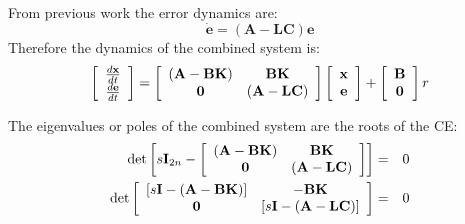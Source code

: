 From previous work the error dynamics are:
\[
\dot{\mathbf{e}} = (\mathbf{A}-\mathbf{LC})\mathbf{e}
\]
Therefore the dynamics of the combined system is:
\[\left[ {\begin{array}{*{20}c}
   {\frac{{d{\bf{x}}}}{{dt}}}  \\
   {\frac{{d{\bf{e}}}}{{dt}}}  \\
\end{array}} \right] = \left[ {\begin{array}{*{20}c}
   {\left( {{\bf{A}} - {\bf{BK}}} \right)} & {{\bf{BK}}}  \\
   {\bf{0}} & {\left( {{\bf{A}} - {\bf{LC}}} \right)}  \\
\end{array}} \right]\left[ {\begin{array}{*{20}c}
   {\bf{x}}  \\
   {\bf{e}}  \\
\end{array}} \right] + \left[ {\begin{array}{*{20}c}
   {\bf{B}}  \\
   {\bf{0}}  \\
\end{array}} \right]r
\]

The eigenvalues or poles of the combined system are the roots of the CE:
\begin{eqnarray*}
	\det \left[ {s{\bf{I}}_{2n}  - \left[ {\begin{array}{*{20}c}
	   {\left( {{\bf{A}} - {\bf{BK}}} \right)} & {{\bf{BK}}}  \\
	   {\bf{0}} & {\left( {{\bf{A}} - {\bf{LC}}} \right)}  \\
	\end{array}} \right]} \right] & = &  0 \\
	\det \left[ {\begin{array}{*{20}c}
	   {\left[ {s{\bf{I}} - \left( {{\bf{A}} - {\bf{BK}}} \right)} \right]} & { - {\bf{BK}}}  \\
	   {\bf{0}} & {\left[ {s{\bf{I}} - \left( {{\bf{A}} - {\bf{LC}}} \right)} \right]}  \\
	\end{array}} \right] & = & 0
\end{eqnarray*}
 

